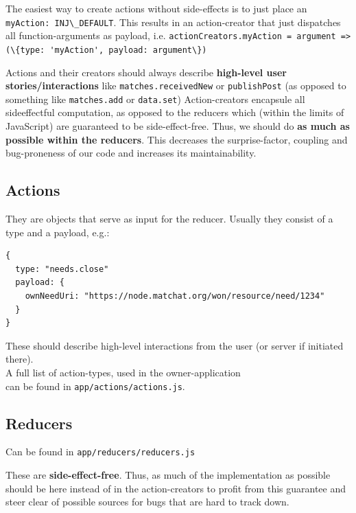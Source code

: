 \documentclass[a4paper,,tablecaptionabove]{scrbook}
\newcommand{\passthrough}[1]{#1}
\begin{document}
The easiest way to create actions without side-effects is to just place
an \passthrough{\lstinline!myAction: INJ\_DEFAULT!}. This results in an
action-creator that just dispatches all function-arguments as payload,
i.e.
\passthrough{\lstinline!actionCreators.myAction = argument => (\{type: 'myAction', payload: argument\})!}

Actions and their creators should always describe \textbf{high-level
user stories/interactions} like
\passthrough{\lstinline!matches.receivedNew!} or
\passthrough{\lstinline!publishPost!} (as opposed to something like
\passthrough{\lstinline!matches.add!} or
\passthrough{\lstinline!data.set!}) Action-creators encapsule all
sideeffectful computation, as opposed to the reducers which (within the
limits of JavaScript) are guaranteed to be side-effect-free. Thus, we
should do \textbf{as much as possible within the reducers}. This
decreases the surprise-factor, coupling and bug-proneness of our code
and increases its maintainability.

\hypertarget{sec:actions}{%
\subsection{Actions}\label{sec:actions}}

They are objects that serve as input for the reducer. Usually they
consist of a type and a payload, e.g.:

\begin{lstlisting}[caption={Example action object}, label=fig:actionjson]
{
  type: "needs.close"
  payload: {
    ownNeedUri: "https://node.matchat.org/won/resource/need/1234"
  }
}
\end{lstlisting}

These should describe high-level interactions from the user (or server
if initiated there).\\
A full list of action-types, used in the owner-application\\
can be found in \passthrough{\lstinline!app/actions/actions.js!}.

\hypertarget{sec:reducers}{%
\subsection{Reducers}\label{sec:reducers}}

Can be found in \passthrough{\lstinline!app/reducers/reducers.js!}

These are \textbf{side-effect-free}. Thus, as much of the implementation
as possible should be here instead of in the action-creators to profit
from this guarantee and steer clear of possible sources for bugs that
are hard to track down.
\end{document}

